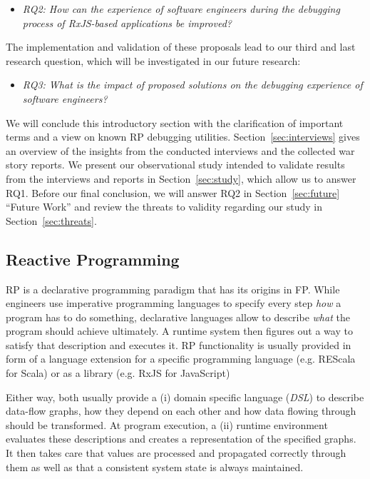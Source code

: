 \documentclass[sigplan,screen,review]{acmart}
\begin{document}
\begin{itemize}
	\item \emph{RQ2: How can the experience of software engineers during the debugging process of RxJS-based applications be improved?}
\end{itemize}

The implementation and validation of these proposals lead to our third and last research question, which will be investigated in our future research:

\begin{itemize}
	\item \emph{RQ3: What is the impact of proposed solutions on the debugging experience of software engineers?}
\end{itemize}

We will conclude this introductory section with the clarification of important terms and a view on known RP debugging utilities. Section~\ref{sec:interviews} gives an overview of the insights from the conducted interviews and the collected war story reports. We present our observational study intended to validate results from the interviews and reports in Section~\ref{sec:study}, which allow us to answer RQ1. Before our final conclusion, we will answer RQ2 in Section~\ref{sec:future} ``Future Work'' and review the threats to validity regarding our study in Section~\ref{sec:threats}.

\subsection{Reactive Programming}

RP is a declarative programming paradigm that has its origins in FP. While engineers use imperative programming languages to specify every step \emph{how} a program has to do something, declarative languages allow to describe \emph{what} the program should achieve ultimately. A runtime system then figures out a way to satisfy that description and executes it. RP functionality is usually provided in form of a language extension for a specific programming language (e.g. REScala for Scala\cite{10.1145/2577080.2577083}) or as a library (e.g. RxJS for JavaScript\cite{rxjs})

Either way, both usually provide a (i) domain specific language (\emph{DSL}) to describe data-flow graphs, how they depend on each other and how data flowing through should be transformed. At program execution, a (ii) runtime environment evaluates these descriptions and creates a representation of the specified graphs. It then takes care that values are processed and propagated correctly through them as well as that a consistent system state\cite{10.1145/2501654.2501666} is always maintained.
\end{document}
